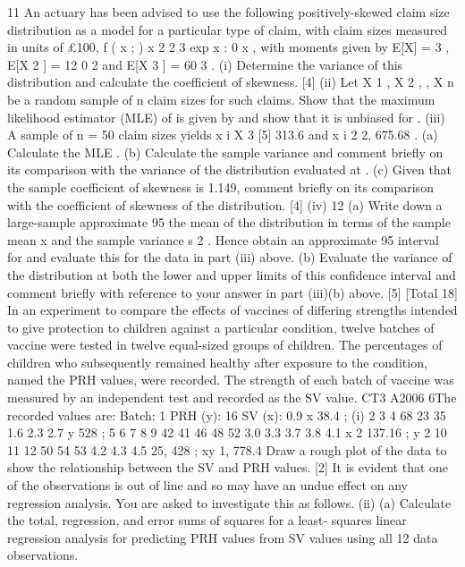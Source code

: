 \documentclass[a4paper,12pt]{article}
\begin{document}
\begin{enumerate}
11
An actuary has been advised to use the following positively-skewed claim size
distribution as a model for a particular type of claim, with claim sizes measured in
units of £100,
f ( x ; )
x 2
2
3
exp
x
: 0
x
,
with moments given by E[X] = 3 , E[X 2 ] = 12
0
2
and E[X 3 ] = 60 3 .
(i) Determine the variance of this distribution and calculate the coefficient of
skewness.
[4]
(ii) Let X 1 , X 2 ,
, X n be a random sample of n claim sizes for such claims.
Show that the maximum likelihood estimator (MLE) of
is given by
and show that it is unbiased for .
(iii)
A sample of n = 50 claim sizes yields x i
X
3
[5]
313.6 and x i 2
2, 675.68 .
(a) Calculate the MLE
.
(b) Calculate the sample variance and comment briefly on its comparison
with the variance of the distribution evaluated at .
(c) Given that the sample coefficient of skewness is 1.149, comment
briefly on its comparison with the coefficient of skewness of the
distribution.
[4]
(iv)
12
(a) Write down a large-sample approximate 95%
the mean of the distribution in terms of the sample mean x and the
sample variance s 2 . Hence obtain an approximate 95%
interval for and evaluate this for the data in part (iii) above.
(b) Evaluate the variance of the distribution at both the lower and upper
limits of this confidence interval and comment briefly with reference to
your answer in part (iii)(b) above.
[5]
[Total 18]
In an experiment to compare the effects of vaccines of differing strengths intended to
give protection to children against a particular condition, twelve batches of vaccine
were tested in twelve equal-sized groups of children. The percentages of children
who subsequently remained healthy after exposure to the condition, named the PRH
values, were recorded. The strength of each batch of vaccine was measured by an
independent test and recorded as the SV value.
CT3 A2006 6The recorded values are:
Batch:
1
PRH (y): 16
SV (x):
0.9
x 38.4 ;
(i)
2
3
4
68 23 35
1.6 2.3 2.7
y
528 ;
5
6
7
8
9
42 41 46 48 52
3.0 3.3 3.7 3.8 4.1
x 2 137.16 ;
y 2
10 11 12
50 54 53
4.2 4.3 4.5
25, 428 ;
xy 1, 778.4
Draw a rough plot of the data to show the relationship between the SV and
PRH values.
[2]
It is evident that one of the observations is out of line and so may have an undue
effect on any regression analysis. You are asked to investigate this as follows.
(ii)
(a) Calculate the total, regression, and error sums of squares for a least-
squares linear regression analysis for predicting PRH values from SV
values using all 12 data observations.

\end{enumerate}
\end{document}
